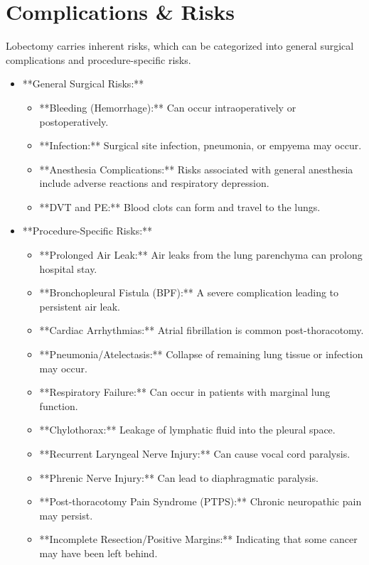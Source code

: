 \section*{Complications \& Risks}
Lobectomy carries inherent risks, which can be categorized into general surgical complications and procedure-specific risks.

\begin{itemize}
  \item **General Surgical Risks:**
    \begin{itemize}
      \item **Bleeding (Hemorrhage):** Can occur intraoperatively or postoperatively.
      \item **Infection:** Surgical site infection, pneumonia, or empyema may occur.
      \item **Anesthesia Complications:** Risks associated with general anesthesia include adverse reactions and respiratory depression.
      \item **DVT and PE:** Blood clots can form and travel to the lungs.
    \end{itemize}
  
  \item **Procedure-Specific Risks:**
    \begin{itemize}
      \item **Prolonged Air Leak:** Air leaks from the lung parenchyma can prolong hospital stay.
      \item **Bronchopleural Fistula (BPF):** A severe complication leading to persistent air leak.
      \item **Cardiac Arrhythmias:** Atrial fibrillation is common post-thoracotomy.
      \item **Pneumonia/Atelectasis:** Collapse of remaining lung tissue or infection may occur.
      \item **Respiratory Failure:** Can occur in patients with marginal lung function.
      \item **Chylothorax:** Leakage of lymphatic fluid into the pleural space.
      \item **Recurrent Laryngeal Nerve Injury:** Can cause vocal cord paralysis.
      \item **Phrenic Nerve Injury:** Can lead to diaphragmatic paralysis.
      \item **Post-thoracotomy Pain Syndrome (PTPS):** Chronic neuropathic pain may persist.
      \item **Incomplete Resection/Positive Margins:** Indicating that some cancer may have been left behind.
    \end{itemize}
\end{itemize}

